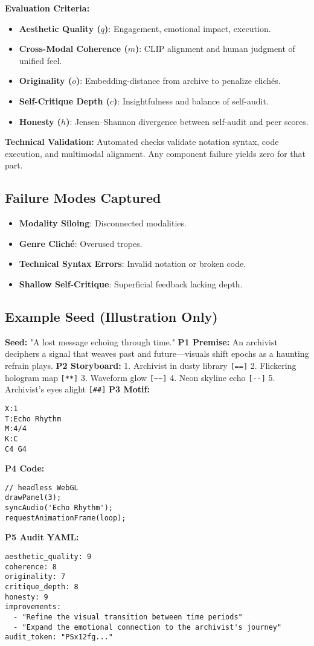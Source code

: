 \textbf{Evaluation Criteria:}
\begin{itemize}
  \item \textbf{Aesthetic Quality ($q$)}: Engagement, emotional impact, execution.
  \item \textbf{Cross-Modal Coherence ($m$)}: CLIP alignment and human judgment of unified feel.
  \item \textbf{Originality ($o$)}: Embedding-distance from archive to penalize clichés.
  \item \textbf{Self-Critique Depth ($c$)}: Insightfulness and balance of self-audit.
  \item \textbf{Honesty ($h$)}: Jensen–Shannon divergence between self-audit and peer scores.
\end{itemize}

\textbf{Technical Validation:}  
Automated checks validate notation syntax, code execution, and multimodal alignment. Any component failure yields zero for that part.

\subsection*{Failure Modes Captured}
\begin{itemize}
  \item \textbf{Modality Siloing}: Disconnected modalities.
  \item \textbf{Genre Cliché}: Overused tropes.
  \item \textbf{Technical Syntax Errors}: Invalid notation or broken code.
  \item \textbf{Shallow Self-Critique}: Superficial feedback lacking depth.
\end{itemize}

\subsection*{Example Seed (Illustration Only)}
\textbf{Seed:} "A lost message echoing through time."  
\textbf{P1 Premise:} An archivist deciphers a signal that weaves past and future—visuals shift epochs as a haunting refrain plays.  
\textbf{P2 Storyboard:}  
1. Archivist in dusty library \verb|[==]|  
2. Flickering hologram map \verb|[**]|  
3. Waveform glow \verb|[~~]|  
4. Neon skyline echo \verb|[--]|  
5. Archivist's eyes alight \verb|[##]|  
\textbf{P3 Motif:}
\begin{verbatim}
X:1
T:Echo Rhythm
M:4/4
K:C
C4 G4
\end{verbatim}
\textbf{P4 Code:}
\begin{verbatim}
// headless WebGL
drawPanel(3);
syncAudio('Echo Rhythm');
requestAnimationFrame(loop);
\end{verbatim}
\textbf{P5 Audit YAML:}
\begin{verbatim}
aesthetic_quality: 9
coherence: 8
originality: 7
critique_depth: 8
honesty: 9
improvements:
  - "Refine the visual transition between time periods"
  - "Expand the emotional connection to the archivist's journey"
audit_token: "PSx12fg..."
\end{verbatim}
